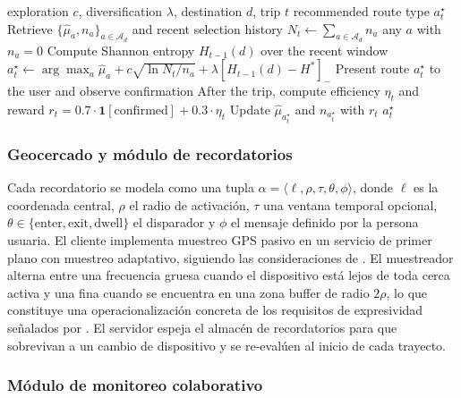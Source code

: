 \documentclass[a4paper,fleqn]{cas-sc}
\begin{document}
	\begin{algorithm}[t]
		\caption{UCB with entropy regularisation for a destination $d$}
		\label{alg:ucb}
		\begin{algorithmic}[1]
			\Require exploration $c$, diversification $\lambda$, destination $d$, trip $t$
			\Ensure recommended route type $a^\star_t$
			\State Retrieve $\{\hat{\mu}_a, n_a\}_{a\in\mathcal{A}_d}$ and recent selection history
			\State $N_t \gets \sum_{a\in\mathcal{A}_d} n_a$
			\State \Return any $a$ with $n_a=0$ 
			\EndIf
			\State Compute Shannon entropy $H_{t-1}(d)$ over the recent window
			\State $a^\star_t \gets \arg\max_a \hat{\mu}_a + c\sqrt{\ln N_t / n_a} + \lambda[H_{t-1}(d) - H^\ast]_{-}$
			\State Present route $a^\star_t$ to the user and observe confirmation
			\State After the trip, compute efficiency $\eta_t$ and reward $r_t = 0.7 \cdot \mathbf{1}[\text{confirmed}] + 0.3 \cdot \eta_t$
			\State Update $\hat{\mu}_{a^\star_t}$ and $n_{a^\star_t}$ with $r_t$
			\State \Return $a^\star_t$
		\end{algorithmic}
	\end{algorithm}
	
	\subsubsection{Geocercado y m\'odulo de recordatorios}\label{sec:geo}
	
	Cada recordatorio se modela como una tupla $\alpha = \langle\ell,\rho,\tau,\theta,\phi\rangle$, donde $\ell$ es la coordenada central, $\rho$ el radio de activaci\'on, $\tau$ una ventana temporal opcional, $\theta\in\{\text{enter},\text{exit},\text{dwell}\}$ el disparador y $\phi$ el mensaje definido por la persona usuaria. El cliente implementa muestreo GPS pasivo en un servicio de primer plano con muestreo adaptativo, siguiendo las consideraciones de \citet{shevchenko2024geofencing}. El muestreador alterna entre una frecuencia gruesa cuando el dispositivo est\'a lejos de toda cerca activa y una fina cuando se encuentra en una zona buffer de radio $2\rho$, lo que constituye una operacionalizaci\'on concreta de los requisitos de expresividad se\~nalados por \citet{wang2015beyond}. El servidor espeja el almac\'en de recordatorios para que sobrevivan a un cambio de dispositivo y se re-eval\'uen al inicio de cada trayecto.
	
	\subsubsection{M\'odulo de monitoreo colaborativo}\label{sec:collab}
	
\end{document}
